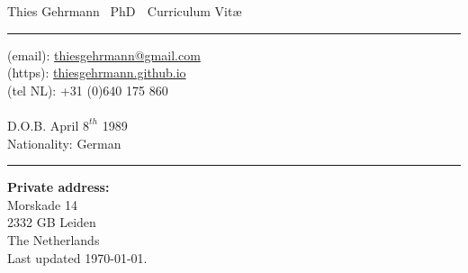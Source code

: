 \documentclass[letterpaper, 10pt]{article} %
\def\doctitle{\color{BrickRed}Curriculum Vit\ae}
\def\name{\color{MidnightBlue}Thies Gehrmann}
\def\maxdeg{\color{Black}PhD}
\begin{document}
\small

\pagestyle{plain}

\label{top}

{\huge {\textbf \name} {\footnotesize $\,$ \maxdeg} $\;$ {\textbf \doctitle} }
\vspace{0.1cm}
\hrule
\vspace{0.5cm}


\begin{minipage}[t]{0.50\textwidth}
  (email): \href{mailto:thiesgehrmann@gmail.com}{thiesgehrmann@gmail.com} \\
  (https): \href{https://thiesgehrmann.github.io}{thiesgehrmann.github.io} \\
  (tel NL): +31 (0)640 175 860     \\
  \\
  D.O.B. April $8^{th}$ 1989 \\
  Nationality: German \\%
  \hrule
  \vspace{5pt}

\end{minipage}
\hfill
\begin{minipage}[t]{0.30\textwidth}
  \textbf{Private address:} \\
  Morskade 14 \\
  2332 GB Leiden \\
  The Netherlands \\

  Last updated \today.
\end{minipage}
\end{document}
